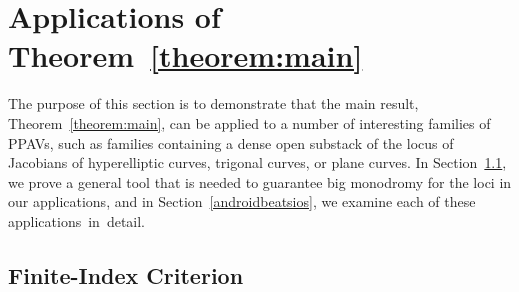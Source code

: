\section{Applications of Theorem~\ref{theorem:main}}\label{iknewyouweretrouble}

The purpose of this section is to demonstrate that the main result, Theorem~\ref{theorem:main}, can be applied to a number of interesting families of PPAVs, such as families containing a dense open substack of the locus of Jacobians of hyperelliptic curves, trigonal curves, or plane curves. In Section~\ref{crit}, we prove a general tool that is needed to guarantee big monodromy for the loci in our applications, and in Section~\ref{androidbeatsios}, we examine each of these \mbox{applications in detail.}

\subsection{Finite-Index Criterion}\label{crit}

